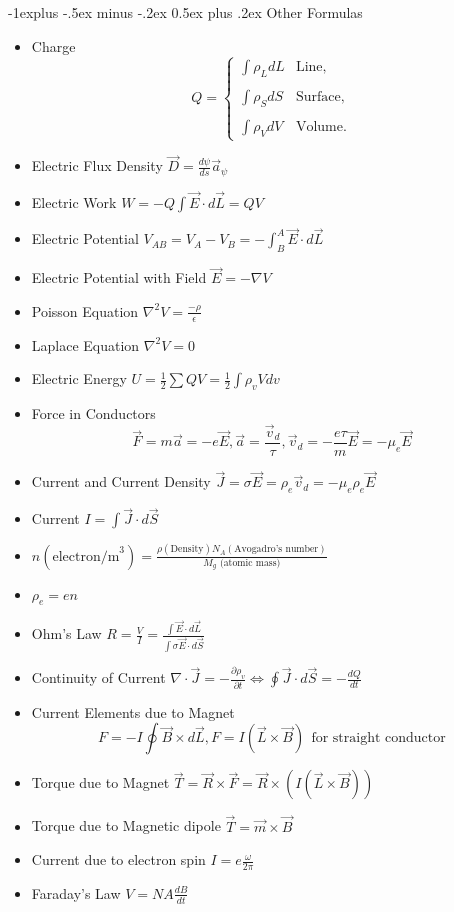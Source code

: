\documentclass[10pt,landscape]{article}
\makeatletter
\renewcommand{\subsection}{\@startsection{subsection}{2}{0mm}%
                                {-1explus -.5ex minus -.2ex}%
                                {0.5ex plus .2ex}%
                                {\normalfont\normalsize\bfseries}}
\makeatother
\begin{document}
\begin{multicols*}{3}
\subsection{Other Formulas}
\begin{itemize}
    \item Charge \[
Q = 
\begin{cases}
   \int \rho_L dL & \text{Line}, \\ \\
    \int \rho_S dS & \text{Surface}, \\ \\
     \int \rho_V dV & \text{Volume}.
\end{cases}
\]
    \item Electric Flux Density $\vec{D} = \frac{d\psi}{ds} \vec{a}_{\psi}$
     \item Electric Work $W = - Q \int \vec{E} \cdot d\vec{L} = QV$
     \item Electric Potential $V_{AB} = V_A - V_B = - \int_B^A \vec{E} \cdot d\vec{L}$
     \item Electric Potential with Field $\vec{E} = -\nabla V$
     \item Poisson Equation $\nabla^2 V = \frac{- \rho}{\epsilon}$
     \item Laplace Equation $\nabla^2 V = 0$
     \item Electric Energy $U = \frac{1}{2} \sum QV =\frac{1}{2} \int \rho_v V dv$ 
     \item Force in Conductors 
    $$ \vec{F} = m\vec{a} = - e \vec{E}, \vec{a} = \frac{\vec{v}_d}{\tau}, \vec{v}_d = - \frac{e\tau}{m} \vec{E} = -\mu_e \vec{E}$$
    \item  Current and Current Density $\vec{J} = \sigma \vec{E} = \rho_e \vec{v}_d = -\mu_e \rho_e \vec{E}$ \\ 
    \item  Current $I = \int \vec{J} \cdot d\vec{S}$
    \item $n (\text{electron/m}^3) = \frac{\rho (\text{Density}) N_A (\text{Avogadro’s number})}{M_g \text{ (atomic mass)}}$
    \item {}  $\rho_e = en$
    \item Ohm's Law $R = \frac{V}{I} = \frac{\int \vec{E} \cdot d\vec{L}}{\int \sigma \vec{E} \cdot d\vec{S}}$
    \item Continuity of Current $\nabla \cdot \vec{J} = - \frac{\partial \rho_v}{\partial t} \Longleftrightarrow \oint \vec{J} \cdot d\vec{S} = - \frac{dQ}{dt}$
    \item Current Elements due to Magnet $$F = -I \oint \vec{B} \times d\vec{L}, F= I (\vec{L} \times \vec{B}) \ \ \text{for straight conductor}$$
    \item Torque due to Magnet $\vec{T} = \vec{R} \times \vec{F} = \vec{R} \times (I (\vec{L} \times \vec{B}))$
    \item Torque due to Magnetic dipole $\vec{T} = \vec{m} \times \vec{B}$
    \item Current due to electron spin $I = e \frac{\omega}{2\pi}$
    \item Faraday's Law $V = NA \frac{dB}{dt}$
\end{itemize}


\end{multicols*}
\end{document}
